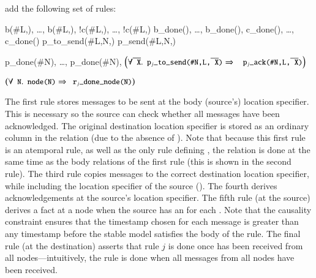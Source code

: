 add the following set of rules:

\begin{Drules}
      {b(#L,), \ldots, b(#L,), !c(#L,), \ldots, !c(#L,)}
      {b_done(), \ldots, b_done(), c_done(), \ldots, c_done()}
      {p_to_send(#L,N,)}
      {p_send(#L,N,)}

      {p_done(#N), \ldots, p_done(#N), \(\left(\forall \od{X} . \dedalus{p\sub{j}_to_send(#N,L,\od{X})} \Rightarrow \right.\) \(\left. \dedalus{p\sub{j}_ack(#N,L,\od{X})}\right)\)}

      {\(\left(\forall \dedalus{N} . \dedalus{node(N)} \Rightarrow \dedalus{r\sub{j}_done_node(N)}\right)\)}
\end{Drules}

The first rule stores messages to be sent at the body (source's) location specifier.  This is necessary so the source can check whether all messages have been acknowledged.  The original destination location specifier is stored as an ordinary column in the  relation (due to the absence of \dedalus{#}).  Note that because this first rule is an atemporal rule, as well as the only rule defining , the  relation is done at the same time as the body relations of the first rule (this is shown in the second rule).  The third rule copies messages to the correct destination location specifier, while including the location specifier of the source ().  The fourth derives acknowledgements at the source's location specifier.  The fifth rule (at the source) derives a  fact at a node when the source has an  for each .  Note that the causality constraint ensures that the timestamp chosen for each  message is greater than any timestamp before the stable model satisfies the body of the rule.  The final rule (at the destination) asserts that rule $j$ is done once  has been received from all nodes---intuitively, the rule is done when all messages from all nodes have been received.

